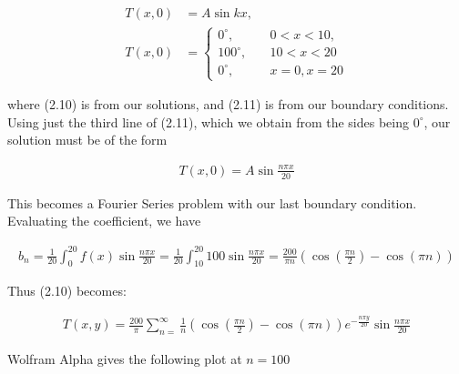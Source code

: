 \documentclass{article}
\numberwithin{equation}{section}
\begin{document}
\begin{align}
    T(x,0) &= A \sin kx, \\
    T(x,0) &= \begin{cases}
        0^{\circ}, \quad &0 < x < 10, \\
        100^{\circ}, \quad &10 < x < 20 \\
        0^{\circ}, \quad &x = 0, x = 20
    \end{cases}
\end{align}

where (2.10) is from our solutions, and (2.11) is from our boundary conditions. Using just the third line of (2.11), which we obtain from the sides being $0^\circ$, our solution must be of the form

\begin{align}
    T(x,0) = A \sin{\frac{n \pi x}{20}} 
\end{align}

This becomes a Fourier Series problem with our last boundary condition. Evaluating the coefficient, we have 

\begin{align}
    b_n = \frac{1}{20}\int_{0}^{20} f(x) \sin \frac{n \pi x}{20} = \frac{1}{20} \int_{10}^{20}100 \sin \frac{n \pi x}{20} = \frac{200}{\pi n} (\cos(\frac{\pi n}{2}) - \cos(\pi n))
\end{align}

Thus (2.10) becomes:

\begin{align}
    T(x,y) = \frac{200}{\pi}\sum_{n=}^{\infty} \frac{1}{n}(\cos(\frac{\pi n}{2}) - \cos(\pi n)) e^{-\frac{n\pi y}{20}} \sin \frac{n\pi x}{20}
\end{align}

Wolfram Alpha gives the following plot at $n=100$
\end{document}

